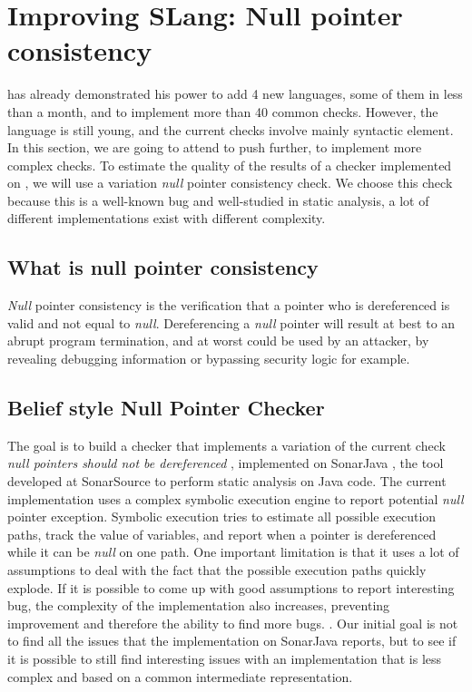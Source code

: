 \section{Improving SLang: Null pointer consistency}
\label{sec:improving_slang}

\slang{} has already demonstrated his power to add 4 new languages, some of them in less than a month, and to implement more than 40 common checks. 
However, the language is still young, and the current checks involve mainly syntactic element. 
In this section, we are going to attend to push \slang{} further, to implement more complex checks.
To estimate the quality of the results of a checker implemented on \slang{}, we will use a variation \emph{null} pointer consistency check. 
We choose this check because this is a well-known bug and well-studied in static analysis, a lot of different implementations exist with different complexity.

\subsection{What is null pointer consistency}
\label{subsec:null_pointer_consistency}

\emph{Null} pointer consistency is the verification that a pointer who is dereferenced is valid and not equal to \emph{null}. Dereferencing a \emph{null} pointer will result at best to an abrupt program termination, and at worst could be used by an attacker, by revealing debugging information or bypassing security logic for example.

\subsection{Belief style Null Pointer Checker}
\label{subsec:belief_style}

The goal is to build a checker that implements a variation of the current check \emph{null pointers should not be dereferenced} \cite{RSPEC-2259:2019:Online}, implemented on SonarJava \cite{SonarJava:2019:Online}, the tool developed at SonarSource to perform static analysis on Java code.
The current implementation uses a complex symbolic execution engine to report potential \emph{null} pointer exception.
Symbolic execution tries to estimate all possible execution paths, track the value of variables, and report when a pointer is dereferenced while it can be \emph{null} on one path.
One important limitation is that it uses a lot of assumptions to deal with the fact that the possible execution paths quickly explode. 
If it is possible to come up with good assumptions to report interesting bug, the complexity of the implementation also increases, preventing improvement and therefore the ability to find more bugs. \cite{Brown:2016:BSC:2954679.2872364}. 
Our initial goal is not to find all the issues that the implementation on SonarJava reports, but to see if it is possible to still find interesting issues with an implementation that is less complex and based on a common intermediate representation.

